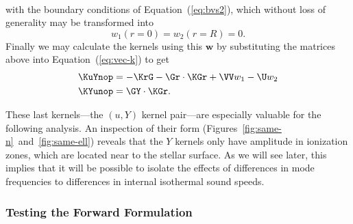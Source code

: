 \begin{description}
\begin{align}
\end{align}
with the boundary conditions of Equation~(\ref{eq:bvs2}), which without loss of generality may be transformed into
\begin{equation} \label{eq:bvs}
    w_1(r = 0) = w_2(r=R) = 0.
\end{equation}
Finally we may calculate the kernels using this $\mathbf w$ by substituting the matrices above into Equation~(\ref{eq:vec-k}) to get
\begin{align}
    \KuYnop &= -\KrG - \Gr \cdot \KGr + \VV w_1 - \U w_2 \\
    \KYunop &= \GY \cdot \KGr.
\end{align}
\end{description}
These last kernels---the ${(u,Y)}$ kernel pair---are especially valuable for the following analysis. 
An inspection of their form (Figures~\ref{fig:same-n}~and~\ref{fig:same-ell}) reveals that the $Y$ kernels only have amplitude in ionization zones, which are located near to the stellar surface. 
As we will see later, this implies that it will be possible to isolate the effects of differences in mode frequencies to differences in internal isothermal sound speeds. 

\newpage
\subsubsection*{Testing the Forward Formulation}

